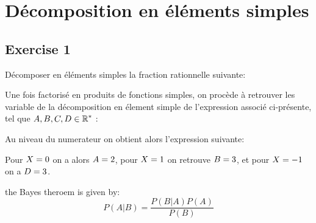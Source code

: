 \documentclass[11pt, openright]{book}
\begin{document}




\newpage

\section{Décomposition en éléments simples}

\subsection{Exercise 1}
Décomposer en éléments simples la fraction rationnelle suivante:


Une fois factorisé en produits de fonctions simples, on procède à retrouver les variable de la décomposition en élement simple de l'expression associé ci-présente, tel que $\displaystyle{A,B,C,D\in \mathbb{R}^{*}}$ :

Au niveau du numerateur on obtient alors l'expression suivante:

Pour $\displaystyle{X=0}$ on a alors $\displaystyle{A=2}$, pour $\displaystyle{X=1}$ on retrouve $\displaystyle{B=3}$, et pour $\displaystyle{X=-1}$ on a $\displaystyle{D=3}$.




the Bayes theroem is given by:
\begin{equation}
    P(A|B) = \frac{P(B|A)P(A)}{P(B)}
\end{equation}


\newpage
\end{document}

